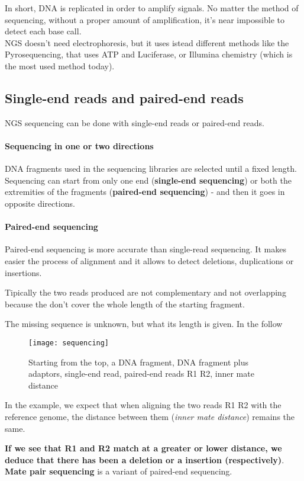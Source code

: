 In short, DNA is replicated in order to amplify signals. No matter the method
of sequencing, without a proper amount of amplification, it's near impossible
to detect each base call. \\

NGS doesn't need electrophoresis, but it uses istead different methods
like the Pyrosequencing, that uses ATP and Luciferase, or Illumina
chemistry (which is the most used method today).

\subsection{Single-end reads and paired-end reads}

NGS sequencing can be done with single-end reads or paired-end reads.

\paragraph*{Sequencing in one or two directions}

DNA fragments used in the sequencing libraries are selected until a fixed
length.
Sequencing can start from only one end (\textbf{single-end sequencing})
or both the extremities of the fragments (\textbf{paired-end sequencing})
- and then it goes in opposite directions.

\paragraph*{Paired-end sequencing}
Paired-end sequencing is more accurate than single-read sequencing.
It makes easier the process of alignment and it allows to detect deletions,
duplications or insertions.

Tipically the two reads produced are not complementary and not overlapping
because the don't cover the whole length of the starting fragment.

The missing sequence is unknown, but what its length is given.
In the follow

\begin{figure}[H]
  \centering
  \texttt{[image: sequencing]}
  \caption{Starting from the top, a DNA fragment, DNA fragment plus adaptors,
single-end read, paired-end reads R1 R2, inner mate distance}
  \label{fig:sequencing}
\end{figure}

In the example, we expect that when aligning the two reads R1 R2 with the
reference genome, the distance between them (\textit{inner mate distance})
remains the same.

\textbf{If we see that R1 and R2 match at a greater or lower distance, we
deduce that there has been a deletion or a insertion (respectively)}.\\

\textbf{Mate pair sequencing} is a variant of paired-end sequencing.

